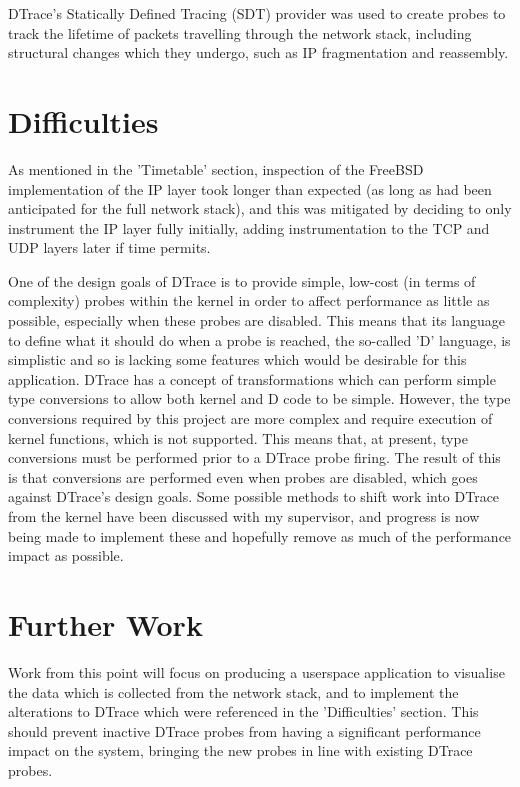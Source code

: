 \documentclass[a4paper,12pt,twoside,openright]{report}
\begin{document}
	DTrace's Statically Defined Tracing (SDT) provider was used to create probes to track the lifetime of packets travelling through the network stack, including structural changes which they undergo, such as IP fragmentation and reassembly.
	
	\section{Difficulties}
	
	As mentioned in the 'Timetable' section, inspection of the FreeBSD implementation of the IP layer took longer than expected (as long as had been anticipated for the full network stack), and this was mitigated by deciding to only instrument the IP layer fully initially, adding instrumentation to the TCP and UDP layers later if time permits.
	
	One of the design goals of DTrace is to provide simple, low-cost (in terms of complexity) probes within the kernel in order to affect performance as little as possible, especially when these probes are disabled. This means that its language to define what it should do when a probe is reached, the so-called 'D' language, is simplistic and so is lacking some features which would be desirable for this application. DTrace has a concept of transformations which can perform simple type conversions to allow both kernel and D code to be simple. However, the type conversions required by this project are more complex and require execution of kernel functions, which is not supported. This means that, at present, type conversions must be performed prior to a DTrace probe firing. The result of this is that conversions are performed even when probes are disabled, which goes against DTrace's design goals. Some possible methods to shift work into DTrace from the kernel have been discussed with my supervisor, and progress is now being made to implement these and hopefully remove as much of the performance impact as possible.
	
	\section{Further Work}
	
	Work from this point will focus on producing a userspace application to visualise the data which is collected from the network stack, and to implement the alterations to DTrace which were referenced in the 'Difficulties' section. This should prevent inactive DTrace probes from having a significant performance impact on the system, bringing the new probes in line with existing DTrace probes.
	
\end{document}
